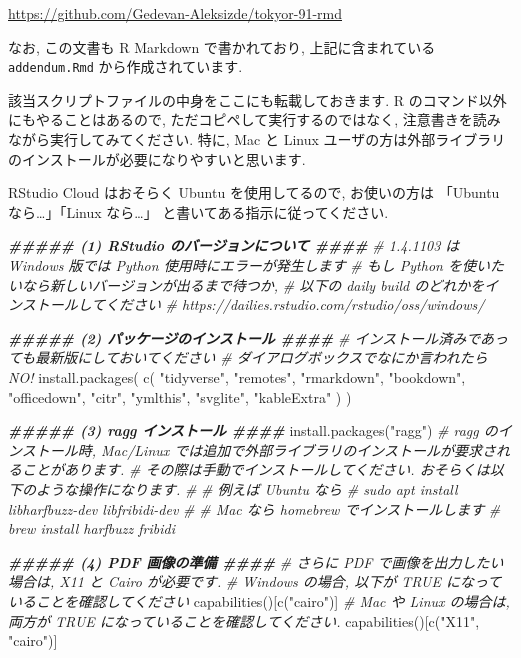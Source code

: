 \documentclass[
]{ltjsarticle}
\newenvironment{Shaded}{\begin{snugshade}}{\end{snugshade}}
\newcommand{\CommentTok}[1]{\textcolor[rgb]{0.56,0.35,0.01}{\textit{#1}}}
\newcommand{\DocumentationTok}[1]{\textcolor[rgb]{0.56,0.35,0.01}{\textbf{\textit{#1}}}}
\newcommand{\FunctionTok}[1]{\textcolor[rgb]{0.00,0.00,0.00}{#1}}
\newcommand{\NormalTok}[1]{#1}
\newcommand{\StringTok}[1]{\textcolor[rgb]{0.31,0.60,0.02}{#1}}
\begin{document}
\url{https://github.com/Gedevan-Aleksizde/tokyor-91-rmd}

なお, この文書も R Markdown で書かれており, 上記に含まれている \texttt{addendum.Rmd} から作成されています.

該当スクリプトファイルの中身をここにも転載しておきます. R のコマンド以外にもやることはあるので, ただコピペして実行するのではなく, 注意書きを読みながら実行してみてください. 特に, Mac と Linux ユーザの方は外部ライブラリのインストールが必要になりやすいと思います.

RStudio Cloud はおそらく Ubuntu を使用してるので, お使いの方は 「Ubuntu なら\ldots」「Linux なら\ldots」 と書いてある指示に従ってください.

\begin{Shaded}
\begin{Highlighting}[numbers=left,,]
\DocumentationTok{\#\#\#\#\# (1) RStudio のバージョンについて \#\#\#\#}
\CommentTok{\# 1.4.1103 は Windows 版では Python 使用時にエラーが発生します}
\CommentTok{\# もし Python を使いたいなら新しいバージョンが出るまで待つか,}
\CommentTok{\# 以下の daily build のどれかをインストールしてください}
\CommentTok{\# https://dailies.rstudio.com/rstudio/oss/windows/}

\DocumentationTok{\#\#\#\#\# (2) パッケージのインストール \#\#\#\#}
\CommentTok{\# インストール済みであっても最新版にしておいてください}
\CommentTok{\# ダイアログボックスでなにか言われたらNO!}
\FunctionTok{install.packages}\NormalTok{(}
  \FunctionTok{c}\NormalTok{(}
    \StringTok{"tidyverse"}\NormalTok{,}
    \StringTok{"remotes"}\NormalTok{,}
    \StringTok{"rmarkdown"}\NormalTok{,}
    \StringTok{"bookdown"}\NormalTok{,}
    \StringTok{"officedown"}\NormalTok{,}
    \StringTok{"citr"}\NormalTok{,}
    \StringTok{"ymlthis"}\NormalTok{,}
    \StringTok{"svglite"}\NormalTok{,}
    \StringTok{"kableExtra"}
\NormalTok{  )}
\NormalTok{)}

\DocumentationTok{\#\#\#\#\# (3) ragg インストール \#\#\#\#}
\FunctionTok{install.packages}\NormalTok{(}\StringTok{"ragg"}\NormalTok{)}
\CommentTok{\# ragg のインストール時, Mac/Linux では追加で外部ライブラリのインストールが要求されることがあります.}
\CommentTok{\# その際は手動でインストールしてください. おそらくは以下のような操作になります.}
\CommentTok{\#}
\CommentTok{\# 例えば Ubuntu なら}
\CommentTok{\# sudo apt install libharfbuzz{-}dev libfribidi{-}dev}
\CommentTok{\#}
\CommentTok{\# Mac なら homebrew でインストールします}
\CommentTok{\# brew install harfbuzz fribidi}

\DocumentationTok{\#\#\#\#\# (4) PDF 画像の準備 \#\#\#\#}
\CommentTok{\# さらに PDF で画像を出力したい場合は, X11 と Cairo が必要です.}
\CommentTok{\# Windows の場合, 以下が TRUE になっていることを確認してください}
\FunctionTok{capabilities}\NormalTok{()[}\FunctionTok{c}\NormalTok{(}\StringTok{"cairo"}\NormalTok{)]}
\CommentTok{\# Mac や Linux の場合は, 両方が TRUE になっていることを確認してください.}
\FunctionTok{capabilities}\NormalTok{()[}\FunctionTok{c}\NormalTok{(}\StringTok{"X11"}\NormalTok{, }\StringTok{"cairo"}\NormalTok{)]}


\end{Highlighting}
\end{Shaded}
\end{document}
